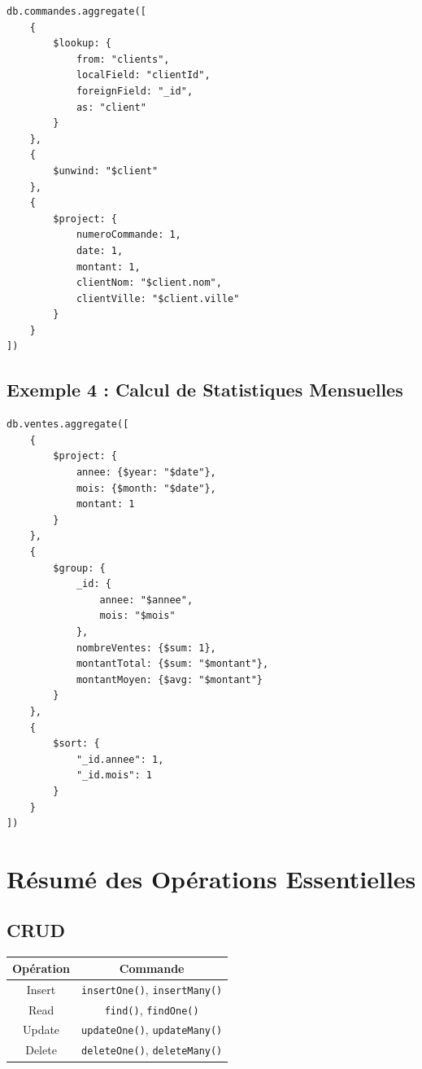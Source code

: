 \documentclass[11pt,a4paper]{article}
\begin{document}
\begin{lstlisting}
db.commandes.aggregate([
    {
        $lookup: {
            from: "clients",
            localField: "clientId",
            foreignField: "_id",
            as: "client"
        }
    },
    {
        $unwind: "$client"
    },
    {
        $project: {
            numeroCommande: 1,
            date: 1,
            montant: 1,
            clientNom: "$client.nom",
            clientVille: "$client.ville"
        }
    }
])
\end{lstlisting}

\subsection{Exemple 4 : Calcul de Statistiques Mensuelles}

\begin{lstlisting}
db.ventes.aggregate([
    {
        $project: {
            annee: {$year: "$date"},
            mois: {$month: "$date"},
            montant: 1
        }
    },
    {
        $group: {
            _id: {
                annee: "$annee",
                mois: "$mois"
            },
            nombreVentes: {$sum: 1},
            montantTotal: {$sum: "$montant"},
            montantMoyen: {$avg: "$montant"}
        }
    },
    {
        $sort: {
            "_id.annee": 1,
            "_id.mois": 1
        }
    }
])
\end{lstlisting}

\newpage

\section{Résumé des Opérations Essentielles}

\subsection{CRUD}

\begin{table}[h]
\centering
\begin{tabular}{|c|c|}
\hline
\textbf{Opération} & \textbf{Commande} \\
\hline
Insert & \texttt{insertOne()}, \texttt{insertMany()} \\
\hline
Read & \texttt{find()}, \texttt{findOne()} \\
\hline
Update & \texttt{updateOne()}, \texttt{updateMany()} \\
\hline
Delete & \texttt{deleteOne()}, \texttt{deleteMany()} \\
\hline
\end{tabular}
\end{table}
\end{document}
